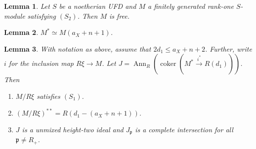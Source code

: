 \documentclass[10pt,a4paper]{amsart}
\newtheorem{lemma}{Lemma}
\DeclareMathOperator{\Ann}{Ann}
\DeclareMathOperator{\coker}{coker}
\newcommand{\frakp}{{\mathfrak p}}
\begin{document}
\begin{lemma}
\label{lemma:S2UFDfree}
Let $S$ be a noetherian UFD and $M$ a finitely generated rank-one
$S$-module satisfying $(S_2)$. 
Then $M$ is free.
\end{lemma}

\begin{lemma}
\label{lemma:Mdual}
$M^* \simeq M(a_X +n + 1)$.
\end{lemma}

\begin{lemma}
\label{lemma:Mmodxi}
With notation as above, assume that $2d_1 \leq a_X +n + 2$. 
Further, write $i$ for the inclusion map $R\xi \to M$.
Let $\displaystyle J = \Ann_R\left(\coker \left(M^*
\stackrel{i^*}{\to}R(d_1)\right)\right)$.
Then 
\begin{enumerate}

\item
\label{lemma:Mmodxi:S1}
$M/R\xi$ satisfies $(S_1)$.

\item
\label{lemma:Mmodxi:NdblDual}
$(M/R\xi)^{**} = R(d_1-(a_X + n + 1))$.

\item
\label{lemma:Mmodxi:Junm}
$J$ is a unmixed height-two ideal and $J_\frakp$ is a complete intersection
for all $\frakp \neq R_+$.

\end{enumerate}
\end{lemma}
\end{document}
